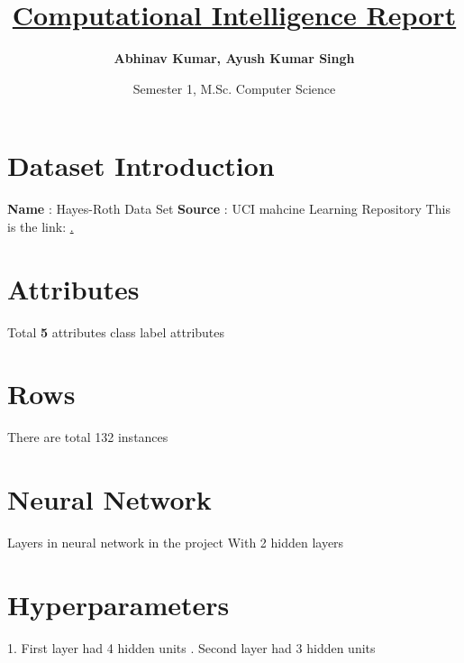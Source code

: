 \documentclass[a4paper,12pt]{article}
\begin{document}
    \title{
        \textbf{
            \underline{Computational Intelligence Report }
        }
    }
    \author{
        \textbf{
            Abhinav Kumar, Ayush Kumar Singh
        }
    }
    \date{Semester 1, M.Sc. Computer Science}
    \maketitle
    \section*{Dataset Introduction}
        \textbf{Name} : Hayes-Roth Data Set
        \newline\newline
        \textbf{Source} : UCI mahcine Learning Repository
        \newline\newline
        This is the link: \href{https://archive.ics.uci.edu/ml/datasets/Hayes-Roth}.
    \newline
    \section*{Attributes}
        Total \textbf{5} attributes
        \newline{} class label
        \newline{} attributes
    \newline
    \section*{Rows}
    There are total 132 instances
    \newline
    \section*{Neural Network}
    Layers in neural network in the project
    \newline
    \newline
    With 2 hidden layers
    \newpage
    \section*{Hyperparameters}
    1. First layer had 4 hidden units
    \newline{}. Second layer had 3 hidden units
\end{document}
